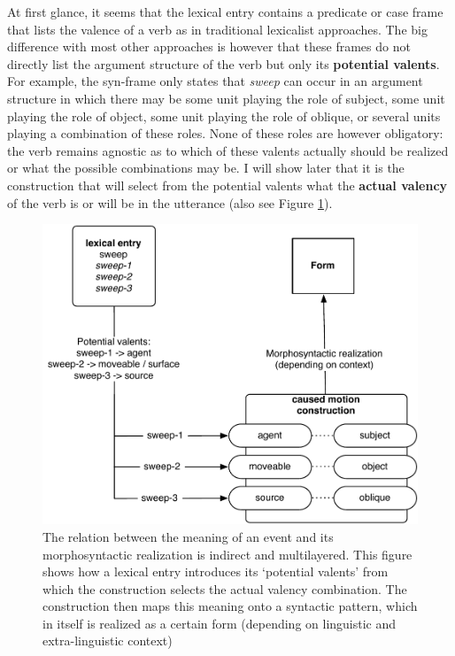 At first glance, it seems that the lexical entry contains a predicate or case frame that lists the valence of a verb as in traditional lexicalist approaches. The big difference with most other approaches is however that these frames do not directly list the argument structure of the verb but only its {\bfseries potential valents}. For example, the syn-frame only states that {\em sweep} can occur in an argument structure in which there may be some unit playing the role of subject, some unit playing the role of object, some unit playing the role of oblique, or several units playing a combination of these roles. None of these roles are however obligatory: the verb remains agnostic as to which of these valents actually should be realized or what the possible combinations may be. I will show later that it is the construction that will select from the potential valents what the {\bfseries actual valency} of the verb is or will be in the utterance (also see Figure \ref{f:sweep-quadrant}).
\begin{figure}[t]
\centerline{\includegraphics[width=0.8\linewidth]{Chapter2/figs/quadrant}}
 \caption[Integrating {\em sweep} with the Caused-Motion Construction]{The relation between the meaning of an event and its morphosyntactic realization is indirect and multilayered. This figure shows how a lexical entry introduces its `potential valents' from which the construction selects the actual valency combination. The construction then maps this meaning onto a syntactic pattern, which in itself is realized as a certain form (depending on linguistic and extra-linguistic context)}
   \label{f:sweep-quadrant}
\end{figure}

